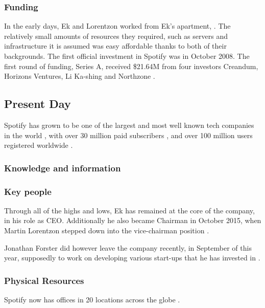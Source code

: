 \subsubsection{Funding}

In the early days, Ek and Lorentzon worked from Ek's apartment, \parencite{JordanCrook2015}. The relatively small amounts of resources they required, such as servers and infrastructure it is assumed was easy affordable thanks to both of their backgrounds. The first official investment in Spotify was in October 2008. The first round of funding, Series A, received \$21.64M from four investors Creandum, Horizons Ventures, Li Ka-shing and Northzone \parencite{Broeders2016}. 

\subsection{Present Day}

Spotify has grown to be one of the largest and most well known tech companies in the world \parencite{Nusca2016}, with over 30 million paid subscribers \parencite{30m_spotify}, and over 100 million users registered worldwide \parencite{Glenday2016}.

\subsubsection{Knowledge and information}

\subsubsection{Key people}

Through all of the highs and lows, Ek has remained at the core of the company, in his role as CEO. Additionally he also became Chairman in October 2015, when Martin Lorentzon stepped down into the vice-chairman position \parencite{lunden2016}.

Jonathan Forster did however leave the company recently, in September of this year, supposedly to work on developing various start-ups that he has invested in \parencite{Glenday2016}. 

\subsubsection{Physical Resources}

Spotify now has offices in 20 locations across the globe \parencite{Spotify2016}.

